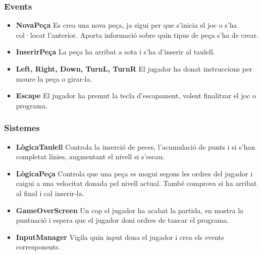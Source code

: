     \subsubsection{Events}

      \begin{itemize}
        \item {\bf NovaPeça}
          Es crea una nova peça, ja sigui per que s'inicia el joc o s'ha col·locat l'anterior. Aporta informació sobre quin tipus de peça s'ha de crear.
          
        \item {\bf InserirPeça}
          La peça ha arribat a sota i s'ha d'inserir al taulell.
          
        \item {\bf Left, Right, Down, TurnL, TurnR}
          El jugador ha donat instruccions per moure la peça o girar-la.
          
        \item {\bf Escape}
          El jugador ha premut la tecla d'escapament, volent finalitzar el joc o programa.
          
      \end{itemize}

    \subsubsection{Sistemes}

      \begin{itemize}
        \item {\bf LògicaTaulell}
          Controla la inserció de peces, l'acumulació de punts i si s'han completat línies, augmentant el nivell si s'escau.
          
        \item {\bf LògicaPeça}
          Controla que una peça es mogui segons les ordres del jugador i caigui a una velocitat donada pel nivell actual. També comprova si ha arribat al final i cal inserir-la.
          
        \item {\bf GameOverScreen}
          Un cop el jugador ha acabat la partida, en mostra la puntuació i espera que el jugador doni ordres de tancar el programa.
          
        \item {\bf InputManager}
          Vigila quin input dona el jugador i crea els events corresponents.
          
      \end{itemize}
      
